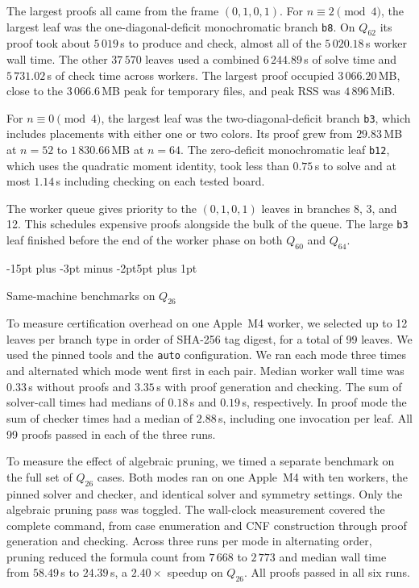 \documentclass[11pt,a4paper]{article}
\makeatletter
\renewcommand{\subsection}{\@startsection{subsection}{2}{\z@}%
  {-15pt plus -3pt minus -2pt}{5pt plus 1pt}%
  {\normalfont\bfseries\raggedright}}
\theoremstyle{result}
\theoremstyle{definition}
\theoremstyle{remark}
\makeatother
\begin{document}
The largest proofs all came from the frame $(0,1,0,1)$.
For $n\equiv2\pmod4$, the largest leaf was the one-diagonal-deficit
monochromatic branch \texttt{b8}. On $Q_{62}$ its proof took about
$5\,019$\,s to produce and check, almost all of the $5\,020.18$\,s
worker wall time. The other $37\,570$ leaves used a combined
$6\,244.89$\,s of solve time and $5\,731.02$\,s of check time
across workers. The largest proof occupied $3\,066.20$\,MB,
close to the $3\,066.6$\,MB peak for temporary files, and
peak RSS was $4\,896$\,MiB.

For $n\equiv0\pmod4$, the largest leaf was the two-diagonal-deficit
branch \texttt{b3}, which includes placements with either one or
two colors. Its proof grew from $29.83$\,MB at $n=52$ to
$1\,830.66$\,MB at $n=64$. The zero-deficit monochromatic leaf
\texttt{b12}, which uses the quadratic moment identity, took
less than $0.75$\,s to solve and at most $1.14$\,s including
checking on each tested board.

The worker queue gives priority to the $(0,1,0,1)$ leaves in
branches 8, 3, and 12. This schedules expensive proofs alongside
the bulk of the queue. The large \texttt{b3} leaf finished before
the end of the worker phase on both $Q_{60}$ and $Q_{64}$.

\subsection{Same-machine benchmarks on \texorpdfstring{$Q_{26}$}{Q26}}

To measure certification overhead on one Apple~M4 worker, we
selected up to 12 leaves per branch type in order of SHA-256
tag digest, for a total of 99 leaves. We used the pinned tools
and the \texttt{auto} configuration. We ran each mode three
times and alternated which mode went first in each pair. Median
worker wall time was $0.33$\,s without proofs and $3.35$\,s
with proof generation and checking. The sum of solver-call
times had medians of $0.18$\,s and $0.19$\,s, respectively.
In proof mode the sum of checker times had a median of
$2.88$\,s, including one invocation per leaf. All 99 proofs
passed in each of the three runs.

To measure the effect of algebraic pruning, we timed a separate
benchmark on the full set of $Q_{26}$ cases.
Both modes ran on one Apple~M4 with ten workers, the pinned
solver and checker, and identical solver and symmetry settings.
Only the algebraic pruning pass was toggled. The wall-clock
measurement covered the complete command, from case enumeration
and CNF construction through proof generation and checking.
Across three runs per mode in alternating order, pruning reduced
the formula count from $7\,668$ to $2\,773$ and median wall time
from $58.49$\,s to $24.39$\,s, a $2.40\times$ speedup on $Q_{26}$.
All proofs passed in all six runs.
\end{document}
